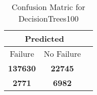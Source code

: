 \begin{table}[] 
\caption{Confusion Matric for DecisionTrees100} 
\label{Table: Prediction Accuracy-NoneDecisionTrees100SVMEKF-ignoreReflection-Reflection} 
\centering 
\begin{tabular} 
 {@{}ccc@{}} 
\toprule 
\multicolumn{2}{c}{\textbf{Predicted}}
 \\ \midrule 
\multicolumn{1}{|c|}{Failure} & 
\multicolumn{1}{c|}{No Failure}
 \\ \midrule 
\multicolumn{1}{|c|}{\color{green}\textbf{137630}} & 
\multicolumn{1}{c|}{\color{green}\textbf{22745}}
 \\ \midrule 
\multicolumn{1}{|c|}{\color{red}\textbf{2771}} & 
\multicolumn{1}{c|}{\color{red}\textbf{6982}}
 \\ \bottomrule 
\end{tabular} 
\end{table} 
